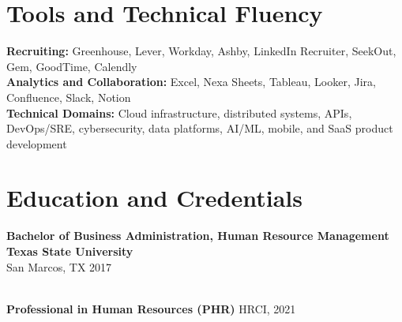 \documentclass[10pt,letterpaper]{article}
\newcommand{\educationentry}[4]{%
  \textbf{#1} \hfill \textbf{#2}\\[-0.05em]
  #3 \hfill #4
}
\begin{document}
\section*{Tools and Technical Fluency}
\textbf{Recruiting:} Greenhouse, Lever, Workday, Ashby, LinkedIn Recruiter, SeekOut, Gem, GoodTime, Calendly\\[0.08em]
\textbf{Analytics and Collaboration:} Excel, Nexa Sheets, Tableau, Looker, Jira, Confluence, Slack, Notion\\[0.08em]
\textbf{Technical Domains:} Cloud infrastructure, distributed systems, APIs, DevOps/SRE, cybersecurity, data platforms, AI/ML, mobile, and SaaS product development

\section*{Education and Credentials}
\educationentry{Bachelor of Business Administration, Human Resource Management}{Texas State University}{San Marcos, TX}{2017}
\\[0.12em]
\textbf{Professional in Human Resources (PHR)} \hfill HRCI, 2021
\end{document}
